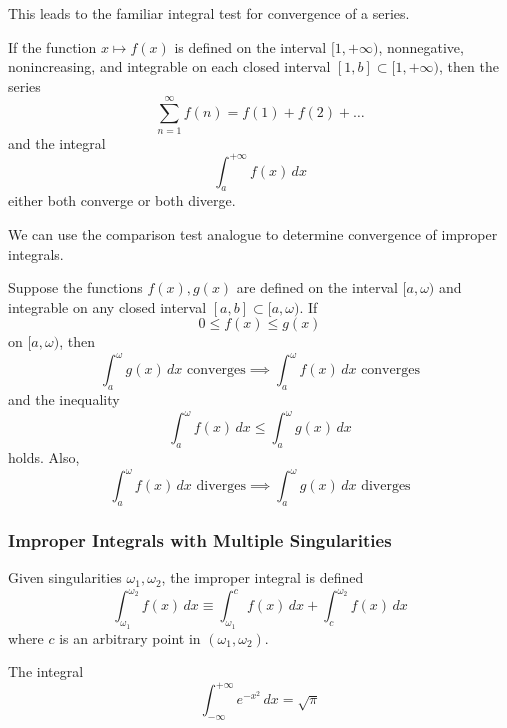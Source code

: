 \documentclass{article}
\begin{document}
        This leads to the familiar integral test for convergence of a series. 

        \begin{theorem}
        If the function $x \mapsto f(x)$ is defined on the interval $[1, +\infty)$, nonnegative, nonincreasing, and integrable on each closed interval $[1, b] \subset [1, +\infty)$, then the series 
        \[\sum_{n=1}^\infty f(n) = f(1) + f(2) + \ldots\]
        and the integral 
        \[\int_a^{+\infty} f(x)\,dx\]
        either both converge or both diverge. 
        \end{theorem}

        We can use the comparison test analogue to determine convergence of improper integrals. 

        \begin{theorem}
        Suppose the functions $f(x), g(x)$ are defined on the interval $[a, \omega)$ and integrable on any closed interval $[a, b] \subset [a, \omega)$. If 
        \[0 \leq f(x) \leq g(x)\]
        on $[a, \omega)$, then 
        \[\int_a^\omega g(x)\,dx \text{ converges} \implies \int_a^\omega f(x)\,dx \text{ converges}\]
        and the inequality 
        \[\int_a^\omega f(x)\,dx \leq \int_a^\omega g(x)\,dx\]
        holds. Also, 
        \[\int_a^\omega f(x)\,dx \text{ diverges} \implies \int_a^\omega g(x)\,dx \text{ diverges}\]
        \end{theorem}
      
      \subsubsection{Improper Integrals with Multiple Singularities}

        \begin{definition}
          Given singularities $\omega_1, \omega_2$, the improper integral is defined
          \[\int_{\omega_1}^{\omega_2} f(x)\,dx \equiv \int_{\omega_1}^c f(x)\,dx + \int_c^{\omega_2} f(x)\,dx\]
          where $c$ is an arbitrary point in $(\omega_1, \omega_2)$. 
        \end{definition}

      \begin{example}
      The integral 
      \[\int_{-\infty}^{+\infty} e^{-x^2}\,dx = \sqrt{\pi}\]
      \end{example}
\end{document}
